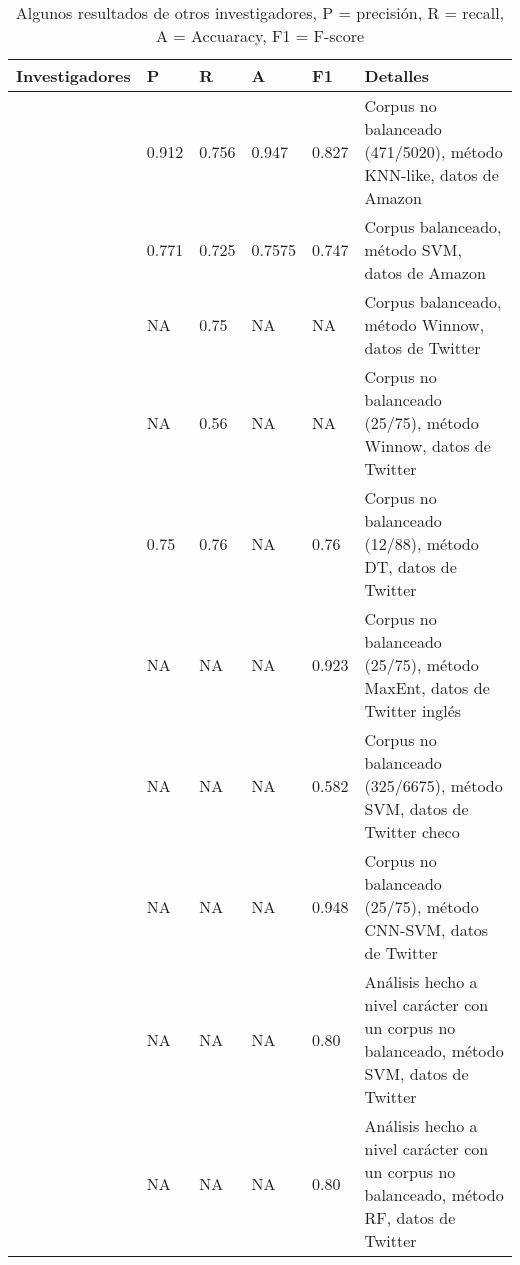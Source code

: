 \begin{table}[!ht]
	\begin{tabular}{|l|l|l|l|l|p{4cm}|}
		\hline
		Investigadores              & P     & R     & A      & F1    & Detalles                                                                                  \\ \hline
		\cite{davidov2010semi}      & 0.912 & 0.756 & 0.947  & 0.827 & Corpus no balanceado (471/5020), método  KNN-like, datos de Amazon                        \\ \hline
		\cite{reyes2012making}      & 0.771 & 0.725 & 0.7575 & 0.747 & Corpus balanceado, método SVM, datos de  Amazon                                           \\ \hline
		\cite{liebrecht2013perfect} & NA    & 0.75  & NA     & NA    & Corpus balanceado, método Winnow, datos de Twitter                                        \\ \hline
		\cite{liebrecht2013perfect} & NA    & 0.56  & NA     & NA    & Corpus no balanceado (25/75), método Winnow, datos de Twitter                             \\ \hline
		\cite{barbieri2014italian}  & 0.75  & 0.76  & NA     & 0.76  & Corpus no balanceado (12/88), método \gls{DT}, datos de  Twitter                          \\ \hline

		\cite{ptavcek2014sarcasm}   & NA    & NA    & NA     & 0.923 & Corpus no balanceado (25/75), método  MaxEnt, datos de Twitter inglés                     \\ \hline
		\cite{ptavcek2014sarcasm}   & NA    & NA    & NA     & 0.582 & Corpus no balanceado (325/6675), método  SVM, datos de Twitter checo                      \\ \hline
		\cite{poria2016deeper}      & NA    & NA    & NA     & 0.948 & Corpus no balanceado (25/75), método  CNN-SVM, datos de Twitter                           \\ \hline
		\cite{lopez2016character}   & NA    & NA    & NA     & 0.80  & Análisis hecho a nivel carácter con un corpus no balanceado, método SVM, datos de Twitter \\ \hline       \cite{lopez2016character}      & NA        & NA     & NA        & 0.80     & Análisis hecho a nivel carácter con un corpus no balanceado, método RF, datos de Twitter                                                                                       \\ \hline
	\end{tabular}
	\caption{Algunos resultados de otros investigadores, P  = precisión, R = recall, A = Accuaracy, F1 = F-score}
	\label{tab:resultados}
\end{table}

